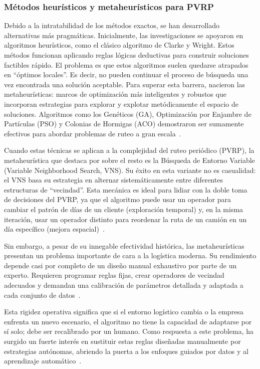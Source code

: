 \subsubsection{Métodos heurísticos y metaheurísticos para PVRP} \label{sec:Metodos}
Debido a la intratabilidad de los métodos exactos, se han desarrollado alternativas más pragmáticas. Inicialmente, las investigaciones se apoyaron en algoritmos heurísticos, como el clásico algoritmo de Clarke y Wright. Estos métodos funcionan aplicando reglas lógicas deductivas para construir soluciones factibles rápido. El problema es que estos algoritmos suelen quedarse atrapados en \enquote{óptimos locales}. Es decir, no pueden continuar el proceso de búsqueda una vez encontrada una solución aceptable. Para superar esta barrera, nacieron las metaheurísticas: marcos de optimización más inteligentes y robustos que incorporan estrategias para explorar y explotar metódicamente el espacio de soluciones. Algoritmos como los Genéticos (GA), Optimización por Enjambre de Partículas (PSO) y Colonias de Hormigas (ACO) demostraron ser sumamente efectivos para abordar problemas de ruteo a gran escala~\cite{EKSIOGLU20091472, Pangaribuan}.

Cuando estas técnicas se aplican a la complejidad del ruteo periódico (PVRP), la metaheurística que destaca por sobre el resto es la Búsqueda de Entorno Variable (Variable Neighborhood Search, VNS). Su éxito en esta variante no es casualidad: el VNS basa su estrategia en alternar sistemáticamente entre diferentes estructuras de \enquote{vecindad}. Esta mecánica es ideal para lidiar con la doble toma de decisiones del PVRP, ya que el algoritmo puede usar un operador para cambiar el patrón de días de un cliente (exploración temporal) y, en la misma iteración, usar un operador distinto para reordenar la ruta de un camión en un día específico (mejora espacial)~\cite{HEMMELMAYR2009791}. 

Sin embargo, a pesar de su innegable efectividad histórica, las metaheurísticas presentan un problema importante de cara a la logística moderna. Su rendimiento depende casi por completo de un diseño manual exhaustivo por parte de un experto. Requieren programar reglas fijas, crear operadores de vecindad adecuados y demandan una calibración de parámetros detallada y adaptada a cada conjunto de datos~\cite{EKSIOGLU20091472}. 

Esta rigidez operativa significa que si el entorno logístico cambia o la empresa enfrenta un nuevo escenario, el algoritmo no tiene la capacidad de adaptarse por sí solo; debe ser recalibrado por un humano. Como respuesta a este problema, ha surgido un fuerte interés en sustituir estas reglas diseñadas manualmente por estrategias autónomas, abriendo la puerta a los enfoques guiados por datos y al aprendizaje automático~\cite{Pangaribuan}.

